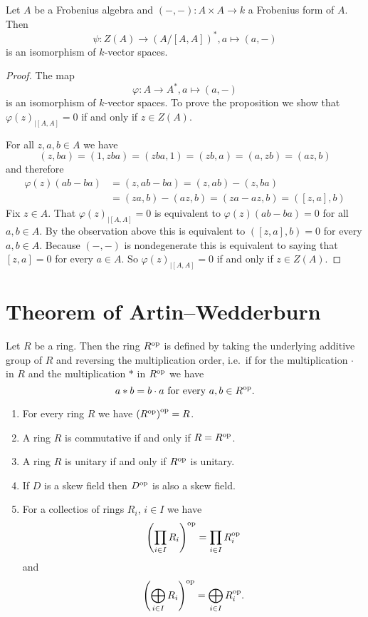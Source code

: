 \begin{prop}
 Let $A$ be a Frobenius algebra and $(-,-) \colon A \times A \to k$ a Frobenius form of $A$. Then
 \[
  \psi \colon Z(A) \to (A/[A,A])^*, a \mapsto (a,-)
 \]
 is an isomorphism of $k$-vector spaces.
\end{prop}
\begin{proof}
 The map
 \[
  \varphi \colon A \to A^*, a \mapsto (a, -)
 \]
 is an isomorphism of $k$-vector spaces. To prove the proposition we show that $\varphi(z)_{|[A,A]} = 0$ if and only if $z \in Z(A)$.
 
 For all $z, a, b \in A$ we have
 \[
  (z,ba) = (1,zba) = (zba,1) = (zb,a) = (a,zb) = (az,b)
 \]
 and therefore
 \begin{align*}
  \varphi(z)(ab-ba)
  &= (z,ab-ba)
  = (z,ab) - (z,ba) \\
  &= (za,b) - (az,b)
  = (za-az,b)
  = ([z,a],b)
 \end{align*}
 Fix $z \in A$. That $\varphi(z)_{|[A,A]} = 0$ is equivalent to $\varphi(z)(ab-ba) = 0$ for all $a,b \in A$. By the observation above this is equivalent to $([z,a],b) = 0$ for every $a,b \in A$. Because $(-,-)$ is nondegenerate this is equivalent to saying that $[z,a] = 0$ for every $a \in A$. So $\varphi(z)_{|[A,A]} = 0$ if and only if $z \in Z(A)$.
\end{proof}





\section{Theorem of Artin--Wedderburn}


\begin{defi}
 Let $R$ be a ring. Then the ring $R^{\mathrm{op}}$ is defined by taking the underlying additive group of $R$ and reversing the multiplication order, i.e.\ if for the multiplication $\cdot$ in $R$ and the multiplication $*$ in $R^{\mathrm{op}}$ we have
 \[
  a * b = b \cdot a \text{ for every } a,b \in R^{\mathrm{op}}.
 \]
\end{defi}


\begin{rem}
 \begin{enumerate}[label=\emph{\alph*)},leftmargin=*]
  \item
   For every ring $R$ we have $\left( R^{\mathrm{op}} \right)^{\mathrm{op}} = R$.
  \item
   A ring $R$ is commutative if and only if $R = R^{\mathrm{op}}$.
  \item
   A ring $R$ is unitary if and only if $R^{\mathrm{op}}$ is unitary.
  \item
   If $D$ is a skew field then $D^{\mathrm{op}}$ is also a skew field.
  \item
   For a collectios of rings $R_i$, $i \in I$ we have
   \[
    \left( \prod_{i \in I} R_i \right)^{\mathrm{op}} = \prod_{i \in I} R_i^{\mathrm{op}}
   \]
   and
   \[
    \left( \bigoplus_{i \in I} R_i \right)^{\mathrm{op}} = \bigoplus_{i \in I} R_i^{\mathrm{op}}.
   \]
 \end{enumerate}
\end{rem}


